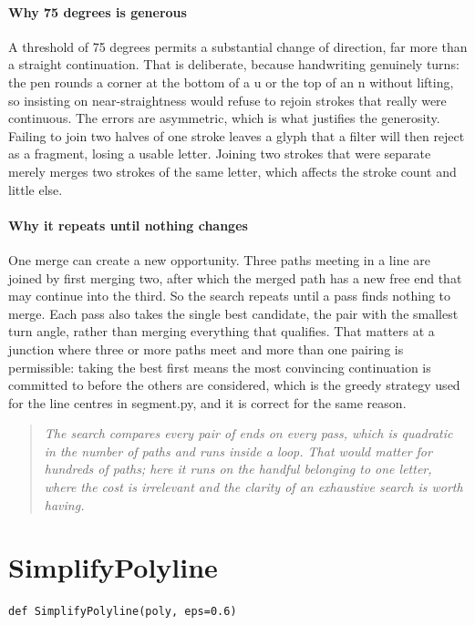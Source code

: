 \paragraph{Why 75 degrees is generous}
A threshold of 75 degrees permits a substantial change of direction, far more than a straight continuation. That is deliberate, because handwriting genuinely turns: the pen rounds a corner at the bottom of a u or the top of an n without lifting, so insisting on near-straightness would refuse to rejoin strokes that really were continuous. The errors are asymmetric, which is what justifies the generosity. Failing to join two halves of one stroke leaves a glyph that a filter will then reject as a fragment, losing a usable letter. Joining two strokes that were separate merely merges two strokes of the same letter, which affects the stroke count and little else.


\paragraph{Why it repeats until nothing changes}
One merge can create a new opportunity. Three paths meeting in a line are joined by first merging two, after which the merged path has a new free end that may continue into the third. So the search repeats until a pass finds nothing to merge. Each pass also takes the single best candidate, the pair with the smallest turn angle, rather than merging everything that qualifies. That matters at a junction where three or more paths meet and more than one pairing is permissible: taking the best first means the most convincing continuation is committed to before the others are considered, which is the greedy strategy used for the line centres in segment.py, and it is correct for the same reason.


\begin{quote}\small\itshape The search compares every pair of ends on every pass, which is quadratic in the number of paths and runs inside a loop. That would matter for hundreds of paths; here it runs on the handful belonging to one letter, where the cost is irrelevant and the clarity of an exhaustive search is worth having.\end{quote}

\section{SimplifyPolyline}
\begin{lstlisting}[style=sig]
def SimplifyPolyline(poly, eps=0.6)
\end{lstlisting}

